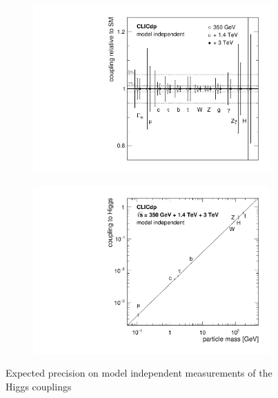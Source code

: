 \begin{figure}
  \centering
  \begin{subfigure}{.49\textwidth}
    \centering
    \includegraphics[width=0.95\linewidth]{Theory/fig/FitResultsMI.pdf}
  \end{subfigure}
    \begin{subfigure}{.49\textwidth}
    \centering
    \includegraphics[width=0.95\linewidth]{Theory/fig/CouplingvsMassMI.pdf}
  \end{subfigure}
    \caption[Expected precision on model independent measurements of the Higgs couplings]{Expected precision on model independent measurements of the Higgs couplings \cite{Abramowicz:2016zbo}}
  \label{fig:modelIndependentCouplings}
\end{figure}

